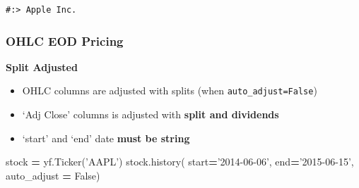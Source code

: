 \documentclass[
]{book}
\newenvironment{Shaded}{\begin{snugshade}}{\end{snugshade}}
\newcommand{\NormalTok}[1]{#1}
\newcommand{\OperatorTok}[1]{\textcolor[rgb]{0.43,0.43,0.43}{\textbf{#1}}}
\newcommand{\StringTok}[1]{\textcolor[rgb]{0.5,0.5,0.5}{#1}}
\newcommand{\VariableTok}[1]{\textcolor[rgb]{0,0,0}{#1}}
\providecommand{\tightlist}{%
  \setlength{\itemsep}{0pt}\setlength{\parskip}{0pt}}
\begin{document}
\begin{verbatim}
#:> Apple Inc.
\end{verbatim}

\hypertarget{ohlc-eod-pricing-1}{%
\subsubsection{OHLC EOD Pricing}\label{ohlc-eod-pricing-1}}

\textbf{Split Adjusted}

\begin{itemize}
\tightlist
\item
  OHLC columns are adjusted with splits (when \texttt{auto\_adjust=False})
\item
  `Adj Close' columns is adjusted with \textbf{split and dividends}\\
\item
  `start' and `end' date \textbf{must be string}
\end{itemize}

\begin{Shaded}
\begin{Highlighting}[]
\NormalTok{stock }\OperatorTok{=}\NormalTok{ yf.Ticker(}\StringTok{'AAPL'}\NormalTok{)}
\NormalTok{stock.history(  start}\OperatorTok{=}\StringTok{'2014-06-06'}\NormalTok{, end}\OperatorTok{=}\StringTok{'2015-06-15'}\NormalTok{, auto_adjust }\OperatorTok{=} \VariableTok{False}\NormalTok{)}
\end{Highlighting}
\end{Shaded}
\end{document}
